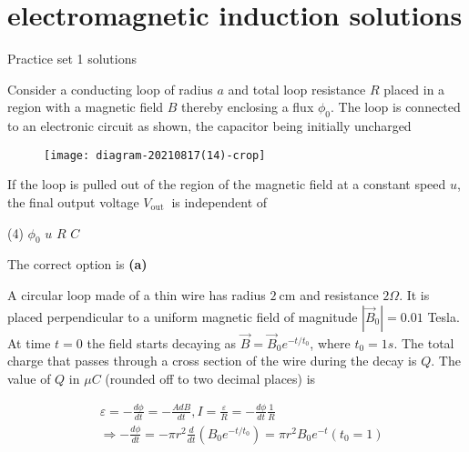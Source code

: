 \chapter{electromagnetic induction solutions}
\begin{abox}
	Practice set 1 solutions
	\end{abox}
\begin{enumerate}
\begin{minipage}{\textwidth}
	\item Consider a conducting loop of radius $a$ and total loop resistance $R$ placed in a region with a magnetic field $B$ thereby enclosing a flux $\phi_{0}$. The loop is connected to an electronic circuit as shown, the capacitor being initially uncharged\\
	\begin{figure}[H]
		\centering
		\texttt{[image: diagram-20210817(14)-crop]}
	\end{figure}
	If the loop is pulled out of the region of the magnetic field at a constant speed $u$, the final output voltage $V_{\text {out }}$ is independent of
\end{minipage}
\begin{tasks}(4)
	\task[\textbf{A.}] $\phi_{0}$
	\task[\textbf{B.}]$u$ 
	\task[\textbf{C.}]$R$
	\task[\textbf{D.}] $C$ 
\end{tasks}
\begin{answer}
	The correct option is \textbf{(a)}	
\end{answer}
\begin{minipage}{\textwidth}
	\item A circular loop made of a thin wire has radius $2 \mathrm{~cm}$ and resistance $2 \Omega$. It is placed perpendicular to a uniform magnetic field of magnitude $\left|\vec{B}_{0}\right|=0.01$ Tesla. At time $t=0$ the field starts decaying as $\vec{B}=\vec{B}_{0} e^{-t / t_{0}}$, where $t_{0}=1 s .$ The total charge that passes through a cross section of the wire during the decay is $Q$. The value of $Q$ in $\mu C$ (rounded off to two decimal places) is
\end{minipage}
\begin{answer}
	$$\begin{aligned}
	& \varepsilon=-\frac{d \phi}{d t}=-\frac{A d B}{d t}, I=\frac{\varepsilon}{R}=-\frac{d \phi}{d t} \frac{1}{R} \\
	&\Rightarrow-\frac{d \phi}{d t}=-\pi r^{2} \frac{d}{d t}\left(B_{0} e^{-t / t_{0}}\right)=\pi r^{2} B_{0} e^{-t}\left(t_{0}=1\right) \\

\end{aligned}$$
\end{answer}
\end{enumerate}
